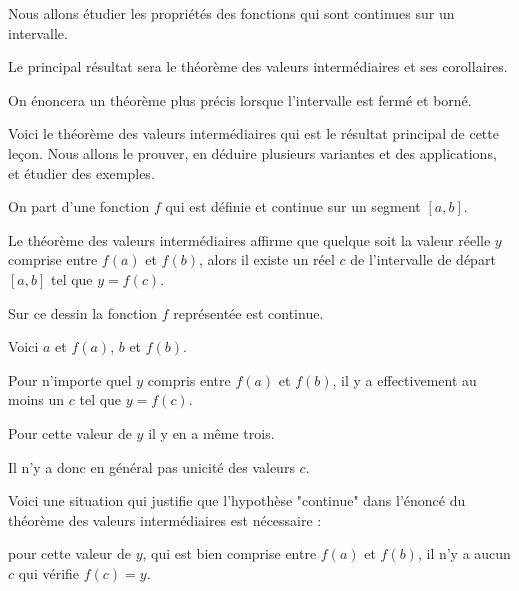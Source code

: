 







\debuttexte



\diapo


\change

Nous allons étudier les propriétés des fonctions qui sont continues sur un intervalle.


\change

Le principal résultat sera le théorème des valeurs intermédiaires et ses corollaires.

\change

On énoncera un théorème plus précis lorsque l'intervalle est fermé et borné.


\diapo


Voici le théorème des valeurs intermédiaires qui est le résultat principal de cette leçon. 
Nous allons le prouver, en déduire plusieurs variantes et des applications, et étudier des exemples.


On part d'une fonction $f$ qui est définie et continue sur un segment $[a,b]$.


Le théorème des valeurs intermédiaires affirme que quelque soit la valeur réelle
 $y$ comprise entre $f(a)$ et $f(b)$, alors il existe un réel $c$ de l'intervalle de départ $[a,b]$ 
 tel que $y=f(c)$.
 
\change

Sur ce dessin la fonction $f$ représentée est continue.

Voici $a$ et $f(a)$, $b$ et $f(b)$.

Pour n'importe quel $y$ compris entre $f(a)$ et $f(b)$,
il y a effectivement au moins un $c$ tel que $y=f(c)$.

Pour cette valeur de $y$ il y en a même trois.

Il n'y a donc en général pas unicité des valeurs $c$.

\change

Voici une situation qui justifie que l'hypothèse "continue" dans l'énoncé du 
théorème des valeurs intermédiaires est nécessaire :

pour cette valeur de $y$, qui est bien comprise entre $f(a)$ et $f(b)$,
il n'y a aucun $c$ qui vérifie $f(c)=y$.

